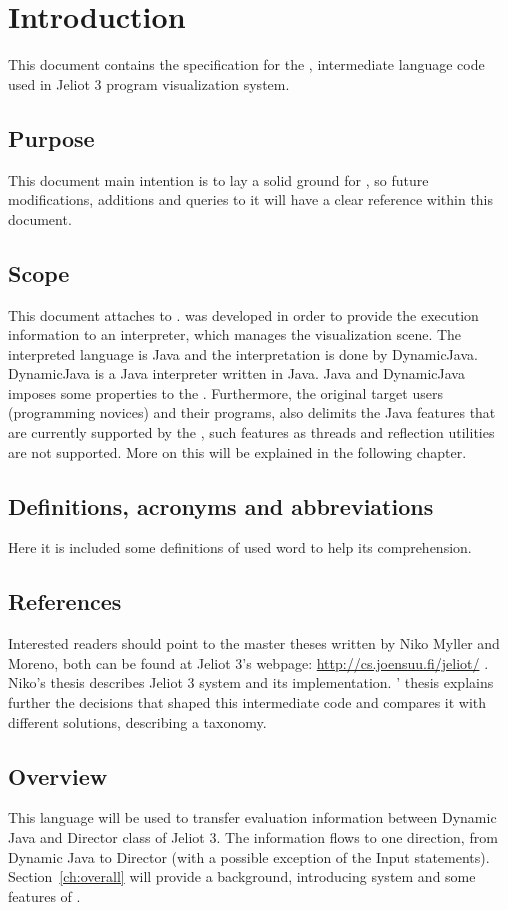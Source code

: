 \chapter{Introduction}
\label{ch:Introduction}
This document contains the specification for the \mcode{}, intermediate language code used in Jeliot 3 program visualization system.
\section{Purpose}
\label{sec:purpose}
This document main intention is to lay a solid ground for \mcode{}, so future modifications, additions and queries to it will have a clear reference within this document.
\section{Scope}
\label{sec:scope}
This document attaches to \jel{}. \mcode{} was developed in order to provide the execution information to an interpreter, which manages the visualization scene. The interpreted language is Java and the interpretation is done by DynamicJava. DynamicJava is a Java interpreter written in Java. Java and DynamicJava imposes some properties to the \mcode{}. Furthermore, the original target users (programming novices) and their programs, also delimits the Java features that are currently supported by the \mcode{}, such features as threads and reflection utilities are not supported. More on this will be explained in the following chapter.
\section{Definitions, acronyms and abbreviations}
\label{sec:definitions}
Here it is included some definitions of used word to help its comprehension.
\section{References}
\label{sec:deferences}
Interested readers should point to the master theses written by Niko Myller and \andres{} Moreno, both can be found at Jeliot 3's webpage: \url{http://cs.joensuu.fi/jeliot/} . Niko's thesis \citep{myllerthesis} describes Jeliot 3 system and its implementation. \andres{}' thesis \citep{morenothesis} explains further the decisions that shaped this intermediate code and compares it with different solutions, describing a taxonomy.
\section{Overview}
\label{sec:overview}
This language will be used to transfer evaluation information between Dynamic Java and Director class of Jeliot 3. The information flows to one direction, from Dynamic Java to Director (with a possible exception of the Input statements).
Section~\ref{ch:overall} will provide a background, introducing \jel{} system and some features of \mcode{}.
